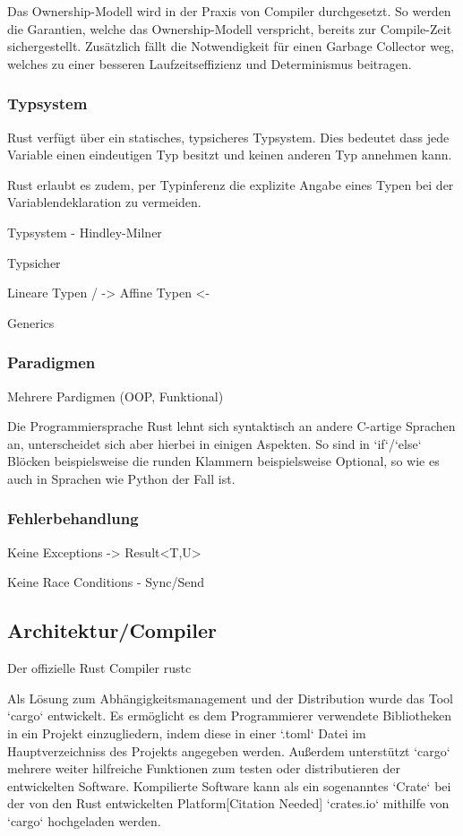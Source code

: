 Das Ownership-Modell wird in der Praxis von Compiler durchgesetzt. So werden die Garantien, welche das Ownership-Modell
verspricht, bereits zur Compile-Zeit sichergestellt. Zusätzlich fällt die Notwendigkeit für einen Garbage Collector weg, welches
zu einer besseren Laufzeitseffizienz und Determinismus beitragen.

\subsubsection{Typsystem}

Rust verfügt über ein statisches, typsicheres Typsystem. Dies bedeutet dass jede Variable einen eindeutigen Typ besitzt und keinen
anderen Typ annehmen kann.

Rust erlaubt es zudem, per Typinferenz die explizite Angabe eines Typen bei der Variablendeklaration zu vermeiden.

Typsystem - Hindley-Milner

Typsicher

Lineare Typen / -> Affine Typen <-

Generics

\subsubsection{Paradigmen}



Mehrere Pardigmen (OOP, Funktional)

Die Programmiersprache Rust lehnt sich syntaktisch an andere C-artige Sprachen an, unterscheidet sich aber hierbei in einigen
Aspekten. So sind in `if`/`else` Blöcken beispielsweise die runden Klammern beispielsweise Optional, so wie es auch in
Sprachen wie Python der Fall ist.

\subsubsection{Fehlerbehandlung}


Keine Exceptions -> Result<T,U>



Keine Race Conditions - Sync/Send

\subsection{Architektur/Compiler}

Der offizielle Rust Compiler rustc 

Als Lösung zum Abhängigkeitsmanagement und der Distribution wurde das Tool `cargo` entwickelt. Es ermöglicht es
dem Programmierer verwendete Bibliotheken in ein Projekt einzugliedern, indem diese in einer `.toml` Datei im Hauptverzeichniss
des Projekts angegeben werden. Außerdem unterstützt `cargo` mehrere weiter hilfreiche Funktionen zum testen oder
distributieren der entwickelten Software. Kompilierte Software kann als ein sogenanntes `Crate` bei der
von den Rust entwickelten Platform[Citation Needed] `crates.io` mithilfe von `cargo` hochgeladen werden.

